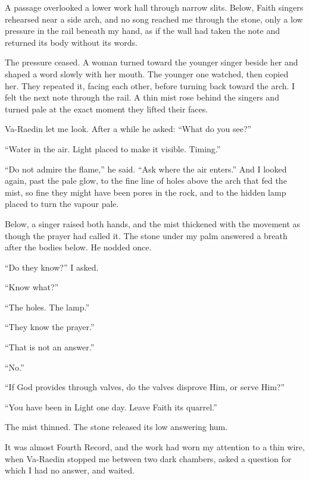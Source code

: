 A passage overlooked a lower work hall through narrow slits. Below, Faith singers rehearsed near a side arch, and no song reached me through the stone, only a low pressure in the rail beneath my hand, as if the wall had taken the note and returned its body without its words.\par

The pressure ceased. A woman turned toward the younger singer beside her and shaped a word slowly with her mouth. The younger one watched, then copied her. They repeated it, facing each other, before turning back toward the arch. I felt the next note through the rail. A thin mist rose behind the singers and turned pale at the exact moment they lifted their faces.\par

Va-Raedin let me look. After a while he asked: ``What do you see?''\par
``Water in the air. Light placed to make it visible. Timing.'' \par
``Do not admire the flame,'' he said. ``Ask where the air enters.'' And I looked again, past the pale glow, to the fine line of holes above the arch that fed the mist, so fine they might have been pores in the rock, and to the hidden lamp placed to turn the vapour pale.\par

Below, a singer raised both hands, and the mist thickened with the movement as though the prayer had called it. The stone under my palm answered a breath after the bodies below. He nodded once.\par

``Do they know?'' I asked.\par
``Know what?''\par
``The holes. The lamp.''\par
``They know the prayer.''\par
``That is not an answer.''\par
``No.''\par
``If God provides through valves, do the valves disprove Him, or serve Him?''\par
``You have been in Light one day. Leave Faith its quarrel.''\par

The mist thinned. The stone released its low answering hum.\par

It was almost Fourth Record, and the work had worn my attention to a thin wire, when Va-Raedin stopped me between two dark chambers, asked a question for which I had no answer, and waited.\par

